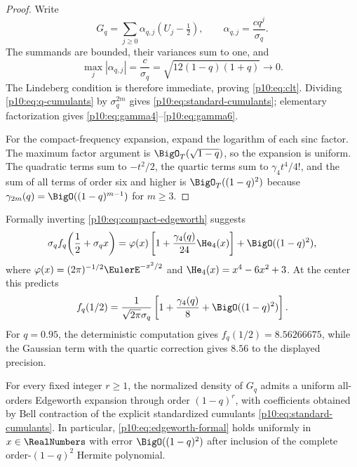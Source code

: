 \documentclass[11pt]{article}
\numberwithin{equation}{section}
\theoremstyle{definition}
\theoremstyle{remark}
\begin{document}
\begin{proof}
Write
\[
 G_q=\sum_{j\ge0}\alpha_{q,j}(U_j-\tfrac12),
 \qquad
 \alpha_{q,j}=\frac{cq^j}{\sigma_q}.
\]
The summands are bounded, their variances sum to one, and
\[
 \max_j|\alpha_{q,j}|=\frac{c}{\sigma_q}
 =\sqrt{12(1-q)(1+q)}\longrightarrow0.
\]
The Lindeberg condition is therefore immediate, proving \eqref{p10:eq:clt}.
Dividing \eqref{p10:eq:q-cumulants} by $\sigma_q^{2m}$ gives
\eqref{p10:eq:standard-cumulants}; elementary factorization gives
\eqref{p10:eq:gamma4}--\eqref{p10:eq:gamma6}.

For the compact-frequency expansion, expand the logarithm of each sinc factor.  The maximum
factor argument is $\BigO_T(\sqrt{1-q})$, so the expansion is uniform.  The quadratic terms
sum to $-t^2/2$, the quartic terms sum to $\gamma_4t^4/4!$, and the sum of all terms of order
six and higher is $\BigO_T((1-q)^2)$ because
$\gamma_{2m}(q)=\BigO((1-q)^{m-1})$ for $m\ge3$.
\end{proof}

Formally inverting \eqref{p10:eq:compact-edgeworth} suggests
\begin{equation}
 \sigma_q f_q\!\left(\frac12+\sigma_qx\right)
 =\varphi(x)\left[1+\frac{\gamma_4(q)}{24}\He_4(x)\right]
 +\BigO((1-q)^2),                                            \label{p10:eq:edgeworth-formal}
\end{equation}
where
\(
 \varphi(x)=(2\pi)^{-1/2}\EulerE^{-x^2/2}
\)
and $\He_4(x)=x^4-6x^2+3$.
At the center this predicts
\begin{equation}
 f_q(1/2)
 =\frac{1}{\sqrt{2\pi}\sigma_q}
  \left[1+\frac{\gamma_4(q)}8+\BigO((1-q)^2)\right].        \label{p10:eq:center-edgeworth}
\end{equation}
For $q=0.95$, the deterministic computation gives $f_q(1/2)=8.56266675$, while the Gaussian
term with the quartic correction gives $8.56$ to the displayed precision.

\begin{conjecture}
\label{p10:conj:edgeworth}
For every fixed integer $r\ge1$, the normalized density of $G_q$ admits a uniform all-orders
Edgeworth expansion through order $(1-q)^r$, with coefficients obtained by Bell contraction
of the explicit standardized cumulants \eqref{p10:eq:standard-cumulants}.  In particular,
\eqref{p10:eq:edgeworth-formal} holds uniformly in $x\in\RealNumbers$ with error
$\BigO((1-q)^2)$ after inclusion of the complete order-$(1-q)^2$ Hermite polynomial.
\end{conjecture}
\end{document}
